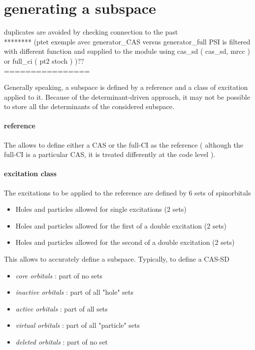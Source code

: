 \documentclass[./thesis.tex]{subfiles}
\begin{document}

\section{generating a subspace}
duplicates are avoided by checking connection to the past \\
******** (ptet exemple avec generator\_CAS versus generator\_full PSI is filtered with different function and supplied to the module using cas\_sd ( cas\_sd, mrcc ) or full\_ci ( pt2 stoch ) )?? \\
================

Generally speaking, a subspace is defined by a reference and a class of excitation applied to it. Because of the determinant-driven approach, it may not be possible to store all the determinants of the considered subspace. 



\paragraph{reference}

The \QP allows to define either a CAS or the full-CI as the reference ( although the full-CI is a particular CAS, it is treated differently at the code level ).

\paragraph{excitation class}
The excitations to be applied to the reference are defined by 6 sets of spinorbitals
\begin{itemize}
\item
Holes and particles allowed for single excitations (2 sets)
\item
Holes and particles allowed for the first of a double excitation (2 sets)
\item
Holes and particles allowed for the second of a double excitation (2 sets)
\end{itemize}

This allows to accurately define a subspace. Typically, to define a CAS-SD

\begin{itemize}
\item
\emph{core orbitals} : part of no sets
\item
\emph{inactive orbitals} : part of all "hole" sets
\item
\emph{active orbitals} : part of all sets
\item
\emph{virtual orbitals} : part of all "particle" sets
\item
\emph{deleted orbitals} : part of no set
\end{itemize}
\end{document}
